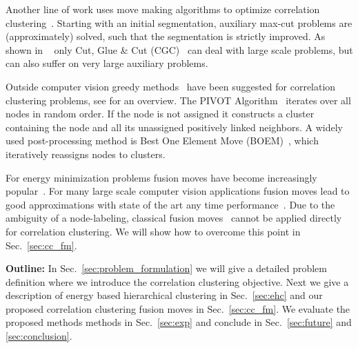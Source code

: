 Another line of work uses move making algorithms 
to optimize correlation clustering~\cite{bansal_2004_ml,beier_2014_cvpr,Kernighan-1970}.
Starting with an initial segmentation, auxiliary max-cut problems are (approximately) solved,
such that the segmentation is strictly improved.
As shown in ~\cite{beier_2014_cvpr} only Cut, Glue \& Cut (CGC)~\cite{beier_2014_cvpr} 
can deal with large scale problems, but can also suffer on very large auxiliary problems.

Outside computer vision greedy methods~\cite{Soon-2001,Ng-2002,Gionis-2007,Elsner-2008,Ailon-2008} have been suggested for correlation clustering problems, see \cite{Elsner-2009} for an overview.
The PIVOT Algorithm~\cite{Ailon-2008} iterates over all nodes in random order.
If the node is not assigned it constructs a cluster containing the node and all its 
unassigned positively linked neighbors.  
%
A widely used post-processing method is  Best One Element Move (BOEM)~\cite{Gionis-2007}, which iteratively reassigns nodes to clusters.

For energy minimization problems fusion moves have become increasingly popular~\cite{Lempitsky-2010,kappes_2014_ws}.
For many large scale computer vision applications fusion moves lead to good approximations
with state of the art any time performance~\cite{kappes_2014_ws}.
Due to the ambiguity of a node-labeling, classical fusion moves~\cite{Lempitsky-2010} cannot be applied directly for correlation clustering.
We will show how to overcome this point in Sec.~\ref{sec:cc_fm}.


\vspace{0.1cm}
\noindent \textbf{Outline:} 
In Sec.~\ref{sec:problem_formulation} we will give a 
detailed problem definition where we introduce 
the correlation clustering objective.
Next we give a description of energy based hierarchical clustering in Sec.~\ref{sec:ehc} and
our proposed correlation clustering fusion moves in Sec.~\ref{sec:cc_fm}.
We evaluate the proposed methods methods in Sec.~\ref{sec:exp} and conclude in Sec.~\ref{sec:future} and \ref{sec:conclusion}.



